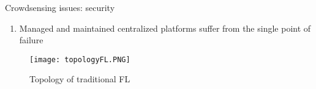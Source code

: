 \begin{frame}{Crowdsensing issues: security}
\begin{multicols}{2}
  		\begin{enumerate}
   			\item Managed and maintained \alert{centralized platforms} suffer from the single point of failure
  		\end{enumerate}
  		\begin{figure}[h]
                \centering
                \texttt{[image: topologyFL.PNG]}
                \caption{Topology of traditional FL}
            \end{figure}
  \end{multicols}
\end{frame}

